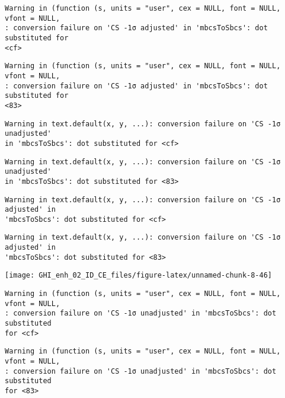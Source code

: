 \documentclass[
  10pt,
  a4paper,oneside]{article}
\begin{document}
\begin{verbatim}
Warning in (function (s, units = "user", cex = NULL, font = NULL, vfont = NULL,
: conversion failure on 'CS -1σ adjusted' in 'mbcsToSbcs': dot substituted for
<cf>
\end{verbatim}

\begin{verbatim}
Warning in (function (s, units = "user", cex = NULL, font = NULL, vfont = NULL,
: conversion failure on 'CS -1σ adjusted' in 'mbcsToSbcs': dot substituted for
<83>
\end{verbatim}

\begin{verbatim}
Warning in text.default(x, y, ...): conversion failure on 'CS -1σ unadjusted'
in 'mbcsToSbcs': dot substituted for <cf>
\end{verbatim}

\begin{verbatim}
Warning in text.default(x, y, ...): conversion failure on 'CS -1σ unadjusted'
in 'mbcsToSbcs': dot substituted for <83>
\end{verbatim}

\begin{verbatim}
Warning in text.default(x, y, ...): conversion failure on 'CS -1σ adjusted' in
'mbcsToSbcs': dot substituted for <cf>
\end{verbatim}

\begin{verbatim}
Warning in text.default(x, y, ...): conversion failure on 'CS -1σ adjusted' in
'mbcsToSbcs': dot substituted for <83>
\end{verbatim}

\begin{center}\texttt{[image: GHI\_enh\_02\_ID\_CE\_files/figure-latex/unnamed-chunk-8-46]} \end{center}

\begin{verbatim}
Warning in (function (s, units = "user", cex = NULL, font = NULL, vfont = NULL,
: conversion failure on 'CS -1σ unadjusted' in 'mbcsToSbcs': dot substituted
for <cf>
\end{verbatim}

\begin{verbatim}
Warning in (function (s, units = "user", cex = NULL, font = NULL, vfont = NULL,
: conversion failure on 'CS -1σ unadjusted' in 'mbcsToSbcs': dot substituted
for <83>
\end{verbatim}
\end{document}
